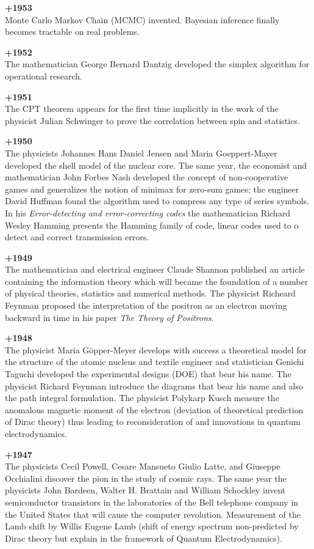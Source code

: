 \textbf{+1953}\\
Monte Carlo Markov Chain (MCMC) invented. Bayesian inference finally becomes tractable on real problems.


\textbf{+1952}\\
The mathematician George Bernard Dantzig developed the simplex algorithm for operational research.

\textbf{+1951}\\
The CPT theorem appears for the first time implicitly in the work of the physicist Julian Schwinger to prove the correlation between spin and statistics.

\textbf{+1950}\\
The physicists Johannes Hans Daniel Jensen and Maria Goeppert-Mayer developed the shell model of the nuclear core. The same year, the economist and mathematician John Forbes Nash developed the concept of non-cooperative games and generalizes the notion of minimax for zero-sum games; the engineer David Huffman found the algorithm used to compress any type of series symbols. In his \textit{Error-detecting and error-correcting codes} the mathematician Richard Wesley Hamming presents the Hamming family of code, linear codes used to o detect and correct transmission errors.

\textbf{+1949}\\
The mathematician and electrical engineer Claude Shannon published an article containing the information theory which will became the foundation of a number of physical theories, statistics and numerical methods. The physicist Richeard Feynman proposed the interpretation of the positron as an electron moving backward in time in his paper \textit{The Theory of Positrons}.

\textbf{+1948}\\
The physicist Maria Göpper-Meyer develops with success a theoretical model for the structure of the atomic nucleus and textile engineer and statistician Genichi Taguchi developed the experimental designs (DOE) that bear his name. The physicist Richard Feynman introduce the diagrams that bear his name and also the path integral formulation. The physicist Polykarp Kusch measure the anomalous magnetic moment of the electron (deviation of theoretical prediction of Dirac theory) thus leading to reconsideration of and innovations in quantum electrodynamics.

\textbf{+1947}\\
The physicists Cecil Powell, Cesare Mansueto Giulio Latte, and Giuseppe Occhialini discover the pion in the study of cosmic rays. The same year the physicists John Bardeen, Walter H. Brattain and William Schockley invent semiconductor transistors in the laboratories of the Bell telephone company in the United States that will cause the computer revolution. Measurement of the Lamb shift by Willis Eugene Lamb (shift of energy spectrum non-predicted by Dirac theory but explain in the framework of Quantum Electrodynamics).

